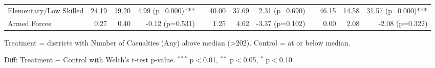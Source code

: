 \begin{table}[htbp]
\begin{tabular}{l rrr c rrr c rrr}
\quad Elementary/Low Skilled & 24.19 & 19.20 & 4.99 (p=0.000)*** &  & 40.00 & 37.69 & 2.31 (p=0.690) &  & 46.15 & 14.58 & 31.57 (p=0.000)*** \\
\quad Armed Forces & 0.27 & 0.40 & -0.12 (p=0.531) &  & 1.25 & 4.62 & -3.37 (p=0.102) &  & 0.00 & 2.08 & -2.08 (p=0.322) \\
\bottomrule
\end{tabular}
\begin{tablenotes}
\small
\item Treatment = districts with Number of Casualties (Any) above median (>202). Control = at or below median.
\item Diff: Treatment $-$ Control with Welch's t-test p-value. $^{{***}}$ p$<$0.01, $^{{**}}$ p$<$0.05, $^{{*}}$ p$<$0.10
\end{tablenotes}
\end{table}